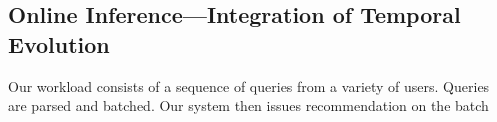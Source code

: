 
%
% 

\subsection{Online Inference---Integration of Temporal Evolution}
Our workload consists of a sequence of queries from a variety of users. Queries are parsed%
and batched. Our system then issues recommendation on the batch%


%


% 
% 

